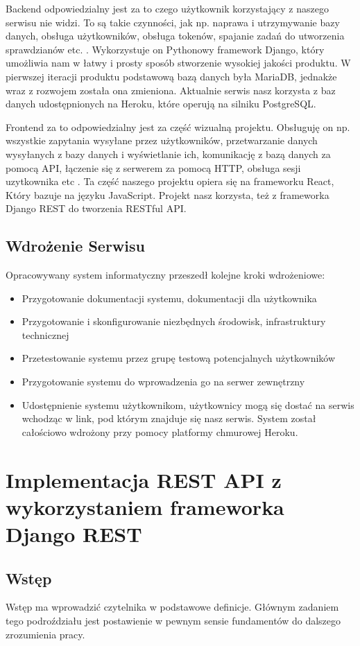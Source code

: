 \documentclass[oneside,polski,logo,indent]{amuthesis}
\begin{document}
Backend odpowiedzialny jest za to czego użytkownik korzystający z naszego serwisu nie widzi. To są takie czynności, jak np. naprawa i utrzymywanie bazy danych, obsługa użytkowników, obsługa tokenów, spajanie zadań do utworzenia sprawdzianów etc. . Wykorzystuje on Pythonowy framework Django, który umożliwia nam w łatwy i prosty sposób stworzenie wysokiej jakości produktu. W pierwszej iteracji produktu podstawową bazą danych była MariaDB, jednakże wraz z rozwojem została ona zmieniona. Aktualnie serwis nasz korzysta z baz danych udostępnionych na Heroku, które operują na silniku PostgreSQL.   

Frontend za to odpowiedzialny jest za część wizualną projektu. Obsługuję on np. wszystkie zapytania wysyłane przez użytkowników, przetwarzanie danych wysyłanych z bazy danych i wyświetlanie ich, komunikację z bazą danych za pomocą API, łączenie się z serwerem za pomocą HTTP, obsługa sesji uzytkownika etc . Ta część naszego projektu opiera się na frameworku React, Który bazuje na języku JavaScript. Projekt nasz korzysta, też z frameworka Django REST do tworzenia RESTful API.


\section{Wdrożenie Serwisu}

Opracowywany system informatyczny przeszedł kolejne kroki wdrożeniowe:
\begin{itemize}
\item Przygotowanie dokumentacji systemu, dokumentacji dla użytkownika
\item Przygotowanie i skonfigurowanie niezbędnych środowisk, infrastruktury technicznej
\item Przetestowanie systemu przez grupę testową potencjalnych użytkowników
\item Przygotowanie systemu do wprowadzenia go na serwer zewnętrzny
\item Udostępnienie systemu użytkownikom, użytkownicy mogą się dostać na serwis wchodząc w link, pod którym znajduje się nasz serwis. System został całościowo wdrożony przy pomocy platformy chmurowej Heroku.
\end{itemize}

\chapter{Implementacja REST API z wykorzystaniem frameworka Django REST}

\section{Wstęp}
Wstęp ma wprowadzić czytelnika w podstawowe definicje. Głównym zadaniem tego podroździału jest postawienie w pewnym sensie fundamentów do dalszego zrozumienia pracy. 
\end{document}
